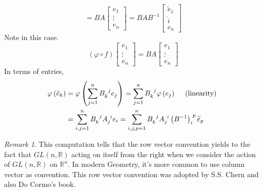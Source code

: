 \documentclass[UTF8,oneside,11pt]{book}
\theoremstyle{plain}\newtheorem{thm}{Theorem}
\theoremstyle{definition}\newtheorem{defn}[thm]{Definition}
\theoremstyle{plain}\newtheorem{axiom}[thm]{Axiom}
\theoremstyle{plain}\newtheorem{coro}[thm]{Corollary}
\theoremstyle{plain}\newtheorem{lemma}[thm]{Lemma}
\theoremstyle{plain}\newtheorem{prop}[thm]{Proposition}
\theoremstyle{plain}\newtheorem{conj}[thm]{Conjecture}
\theoremstyle{plain}\newtheorem{ques}[thm]{Problem}
\theoremstyle{plain}\newtheorem{const}[thm]{Construction}
\theoremstyle{remark}\newtheorem{notation}[thm]{Notation}
\theoremstyle{plain}\newtheorem*{app}{Application}
\theoremstyle{plain}\newtheorem*{exam}{Example}
\theoremstyle{plain}\newtheorem*{exer}{Exercise}
\theoremstyle{remark}\newtheorem*{remark}{Remark}
\theoremstyle{remark}\newtheorem*{note}{\small{Note}}
\numberwithin{equation}{section}
\numberwithin{thm}{section}
\begin{document}
$$
=B A\left[\begin{array}{c}
e_1 \\
\vdots \\
e_n
\end{array}\right]=B A B^{-1}\left[\begin{array}{c}
\tilde{e}_1 \\
\dot{i} \\
e_n
\end{array}\right]
$$
Note in this case.
$$
(\varphi \circ f)\left[\begin{array}{c}
e_1 \\
\vdots \\
e_n
\end{array}\right]=B A\left[\begin{array}{c}
e_1 \\
\vdots \\
e_n
\end{array}\right]
$$
In terms of entries,
$$
\begin{aligned}
\varphi\left(\tilde{e}_k\right) &=\varphi\left(\sum_{j=1}^n B\indices{_k^j} e_j\right)=\sum_{j=1}^n B\indices{_k^j} \varphi\left(e_j\right) \quad \text { (linearity) } \\
&=\sum_{i, j=1}^n B\indices{_k^j} A\indices{_j^i} e_i=\sum_{i,j,p=1}^n B\indices{_k^j} A\indices{_j^i}\left(B^{-1}\right)\indices{_i^p} \widetilde{e}_p
\end{aligned}
$$
\begin{remark}
    This computation tells that the row vector convention yields to the fact that $GL(n,\mathbb{R})$ acting on itself from the right when we consider the action of $GL(n, \mathbb{R})$ on $\mathbb{R}^n$.
    In modern Geometry, it's more common to use column vector as convention. This row vector convention was adopted by S.S. Chern and also Do Cormo's book.
\end{remark}
\end{document}
